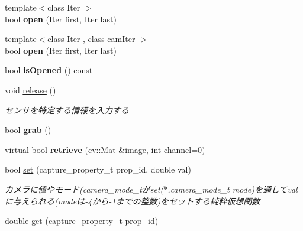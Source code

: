 \begin{DoxyCompactItemize}
{\footnotesize template$<$class Iter $>$ }\\bool {\bfseries open} (Iter first, Iter last)
\item 
\hypertarget{classskl_1_1_video_capture_a773c26b4a2c6170493aabdb868759a0a}{}\label{classskl_1_1_video_capture_a773c26b4a2c6170493aabdb868759a0a} 
{\footnotesize template$<$class Iter , class cam\+Iter $>$ }\\bool {\bfseries open} (Iter first, Iter last)
\item 
\hypertarget{classskl_1_1_video_capture_a790296dad60b4f543c602980af45089f}{}\label{classskl_1_1_video_capture_a790296dad60b4f543c602980af45089f} 
bool {\bfseries is\+Opened} () const
\item 
\hypertarget{classskl_1_1_video_capture_ada3c7e5bb255553692092501df51e132}{}\label{classskl_1_1_video_capture_ada3c7e5bb255553692092501df51e132} 
void \hyperlink{classskl_1_1_video_capture_ada3c7e5bb255553692092501df51e132}{release} ()
\begin{DoxyCompactList}\small\item\em センサを特定する情報を入力する \end{DoxyCompactList}\item 
\hypertarget{classskl_1_1_video_capture_a7bb64b1a7e620908841b5fbaea3179e4}{}\label{classskl_1_1_video_capture_a7bb64b1a7e620908841b5fbaea3179e4} 
bool {\bfseries grab} ()
\item 
\hypertarget{classskl_1_1_video_capture_a6dedcb929497a8368c6865cda807e437}{}\label{classskl_1_1_video_capture_a6dedcb929497a8368c6865cda807e437} 
virtual bool {\bfseries retrieve} (cv\+::\+Mat \&image, int channel=0)
\item 
\hypertarget{classskl_1_1_video_capture_a705b31fcb25b91f8c4d4fdcc1e7c43a0}{}\label{classskl_1_1_video_capture_a705b31fcb25b91f8c4d4fdcc1e7c43a0} 
bool \hyperlink{classskl_1_1_video_capture_a705b31fcb25b91f8c4d4fdcc1e7c43a0}{set} (capture\+\_\+property\+\_\+t prop\+\_\+id, double val)
\begin{DoxyCompactList}\small\item\em カメラに値やモード(camera\+\_\+mode\+\_\+tがset($\ast$,camera\+\_\+mode\+\_\+t mode)を通してvalに与えられる(modeは-\/4から-\/1までの整数)をセットする純粋仮想関数 \end{DoxyCompactList}\item 
\hypertarget{classskl_1_1_video_capture_a3185737070044f7b729ae2c03dcb8fee}{}\label{classskl_1_1_video_capture_a3185737070044f7b729ae2c03dcb8fee} 
double \hyperlink{classskl_1_1_video_capture_a3185737070044f7b729ae2c03dcb8fee}{get} (capture\+\_\+property\+\_\+t prop\+\_\+id)

\end{DoxyCompactItemize}

